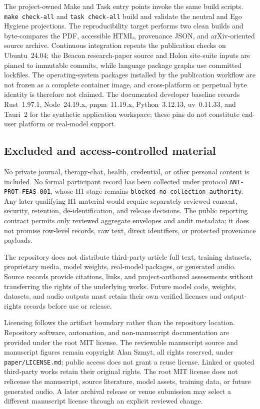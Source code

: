 The project-owned Make and Task entry points invoke the same build scripts.
\texttt{make check-all} and \texttt{task check-all} build and validate the
neutral and Ego Hygiene projections. The reproducibility target performs two
clean builds and byte-compares the PDF, accessible HTML, provenance JSON, and
arXiv-oriented source archive. Continuous integration repeats the publication
checks on Ubuntu~24.04; the Beacon research-paper source and Holon site-suite
inputs are pinned to immutable commits, while language package graphs use
committed lockfiles. The operating-system packages installed by the
publication workflow are not frozen as a complete container image, and
cross-platform or perpetual byte identity is therefore not claimed. The
documented developer baseline records Rust~1.97.1, Node~24.19.x,
pnpm~11.19.x, Python~3.12.13, uv~0.11.33, and Tauri~2 for the synthetic
application workspace; these pins do not constitute end-user platform or
real-model support.

\subsection{Excluded and access-controlled material}
\label{sec:availability-exclusions}

No private journal, therapy-chat, health, credential, or other personal
content is included. No formal participant record has been collected under
protocol \texttt{ANT-PROT-FEAS-001}, whose H1 stage remains
\texttt{blocked-no-collection-authority}. Any later qualifying H1 material
would require separately reviewed consent, security, retention,
de-identification, and release decisions. The public reporting contract permits
only reviewed aggregate envelopes and audit metadata; it does not promise
row-level records, raw text, direct identifiers, or protected provenance
payloads.

The repository does not distribute third-party article full text, training
datasets, proprietary media, model weights, real-model packages, or generated
audio. Source records provide citations, links, and project-authored
assessments without transferring the rights of the underlying works. Future
model code, weights, datasets, and audio outputs must retain their own verified
licenses and output-rights records before use or release.

Licensing follows the artifact boundary rather than the repository location.
Repository software, automation, and non-manuscript documentation are provided
under the root MIT license. The reviewable manuscript source and manuscript
figures remain copyright Alan Szmyt, all rights reserved, under
\texttt{paper/LICENSE.md}; public access does not grant a reuse license. Linked
or quoted third-party works retain their original rights. The root MIT license
does not relicense the manuscript, source literature, model assets, training
data, or future generated audio. A later archival release or venue submission
may select a different manuscript license through an explicit reviewed change.

